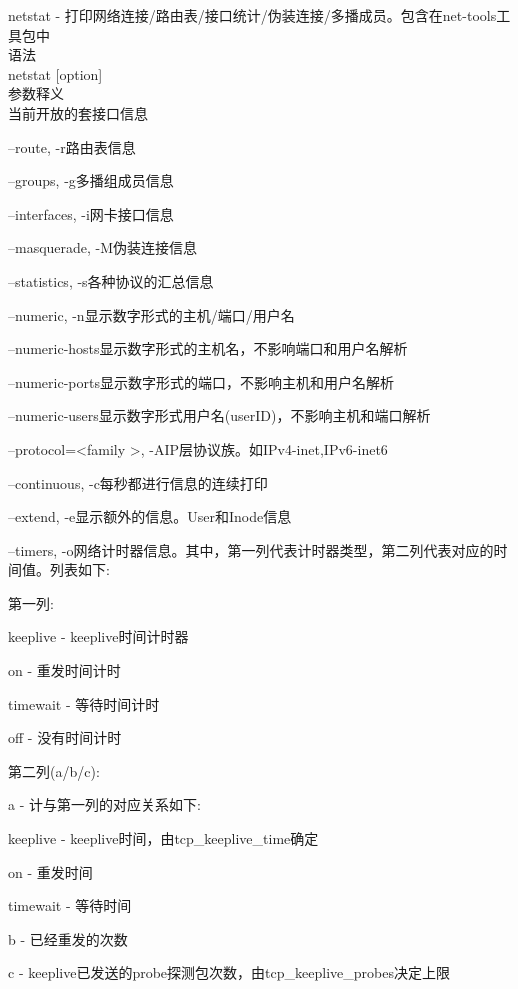 \documentclass[UTF8,fontset=ubuntu]{ctexart}
\begin{document}
\parindent=0cm
netstat - 打印网络连接/路由表/接口统计/伪装连接/多播成员。包含在net-tools工具包中\\[1ex]

语法\\
netstat [option]\\[1ex]

参数释义\\
\qquad 当前开放的套接口信息

--route, -r\quad 路由表信息

--groups, -g\quad 多播组成员信息

--interfaces, -i\quad 网卡接口信息

--masquerade, -M\quad 伪装连接信息

--statistics, -s\quad 各种协议的汇总信息

--numeric, -n\quad 显示数字形式的主机/端口/用户名

--numeric-hosts\quad 显示数字形式的主机名，不影响端口和用户名解析

--numeric-ports\quad 显示数字形式的端口，不影响主机和用户名解析

--numeric-users\quad 显示数字形式用户名(userID)，不影响主机和端口解析

--protocol=\textless family \textgreater, -A\quad IP层协议族。如IPv4-inet,IPv6-inet6

--continuous, -c\quad 每秒都进行信息的连续打印

--extend, -e\quad 显示额外的信息。User和Inode信息

--timers, -o\quad 网络计时器信息。其中，第一列代表计时器类型，第二列代表对应的时间值。列表如下:
    
\qquad 第一列:\par
\qquad keeplive - keeplive时间计时器\par
\qquad on - 重发时间计时\par
\qquad timewait - 等待时间计时\par
\qquad off - 没有时间计时
    
\qquad 第二列(a/b/c):\par
\qquad a - 计与第一列的对应关系如下:\par
\qquad\qquad keeplive - keeplive时间，由tcp\_keeplive\_time确定\par
\qquad\qquad on - 重发时间\par
\qquad\qquad timewait - 等待时间\par
\qquad b - 已经重发的次数\par
\qquad c - keeplive已发送的probe探测包次数，由tcp\_keeplive\_probes决定上限\par
    
\end{document}
